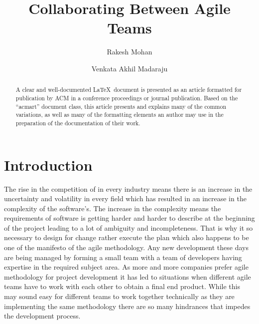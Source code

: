 \documentclass[sigconf]{acmart}
\begin{document}
%
\title{Collaborating Between Agile Teams}

%
\author{Rakesh Mohan}
\author{Venkata Akhil Madaraju}

%
\begin{abstract}
A clear and well-documented \LaTeX\ document is presented as an article formatted for publication by ACM in 
a conference proceedings or journal publication. Based on the ``acmart'' document class, this article presents
and explains many of the common variations, as well as many of the formatting elements
an author may use in the preparation of the documentation of their work.
\end{abstract}


%

%


%
\maketitle


\section{Introduction}
The rise in the competition of in every industry means there is an increase in the uncertainty and volatility in every field which has resulted in an increase in the complexity of the software's. The increase in the complexity means the requirements of software is getting harder and harder to describe at the beginning of the project leading to a lot of ambiguity and incompleteness. That is why it so necessary to design for change rather execute the plan which also happens to be one of the manifesto of the agile methodology. Any new development these days are being managed by forming a small team with a team of developers having expertise in the required subject area. As more and more companies prefer agile methodology for project development it has led to situations when different agile teams have to work with each other to obtain a final end product. While this may sound easy for different teams to work together technically as they are implementing the same methodology there are so many hindrances that impedes the development process.
\end{document}
